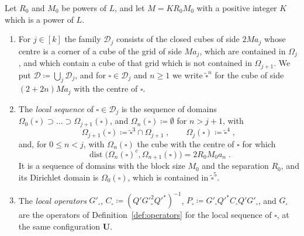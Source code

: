 \documentclass[11pt]{preprint}
\newcommand{\dist}{\operatorname{dist}}
\numberwithin{equation}{section}
\begin{document}
\begin{definition}\label{def:walk-cubes}
Let $R_0$ and $M_0$ be powers of $L$, and let $M = KR_0M_0$ with a positive integer $K$ which is a power of $L$.
\begin{enumerate}[label=(\roman*)]
\item For $j \in [k]$ the family $\mathscr D_j$ consists of the closed cubes of side $2Ma_j$ whose centre is a corner of a cube of the grid of side $Ma_j$, which are contained in $\Omega_j$, and which contain a cube of that grid which is not contained in $\Omega_{j+1}$. We put $\mathscr D \coloneqq \bigcup_j\mathscr D_j$, and for $\square \in \mathscr D_j$ and $n \geqslant 1$ we write $\tilde\square^n$ for the cube of side $(2 + 2n)Ma_j$ with the centre of $\square$.
\item The \emph{local sequence} of $\square \in \mathscr D_j$ is the sequence of domains $\Omega_0(\square) \supset \dots \supset \Omega_{j+1}(\square)$, and $\Omega_n(\square) \coloneqq \emptyset$ for $n > j + 1$, with
\[
    \Omega_{j+1}(\square) \coloneqq \tilde\square^3 \cap \Omega_{j+1}\;,
    \qquad
    \Omega_j(\square) \coloneqq \tilde\square^4\;,
\]
and, for $0 \leqslant n < j$, with $\Omega_n(\square)$ the cube with the centre of $\square$ for which
\begin{equation}\label{eq:local-sequence}
    \dist\bigl(\Omega_n(\square)^c, \Omega_{n+1}(\square)\bigr) = 2R_0M_0a_n\;.
\end{equation}
It is a sequence of domains with the block size $M_0$ and the separation $R_0$, and its Dirichlet domain is $\Omega_0(\square)$, which is contained in $\tilde\square^5$.
\item The \emph{local operators} $G'_\square$, $C_\square \coloneqq (Q'G'^2_\square Q'^*)^{-1}$, $P_\square \coloneqq G'_\square Q'^*C_\square Q'G'_\square$, and $G_\square$ are the operators of Definition~\ref{def:operators} for the local sequence of $\square$, at the same configuration $\mathbf U$.
\end{enumerate}
\end{definition}
\end{document}
